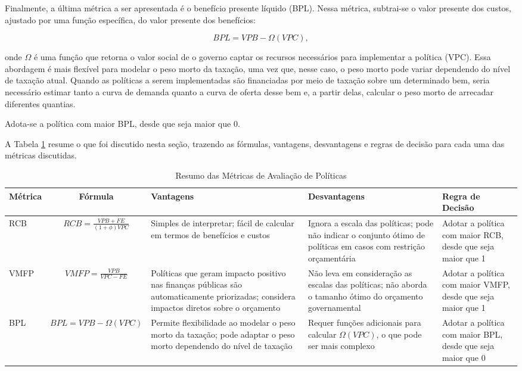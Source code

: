 \documentclass[12pt,letterpaper]{article}
\newcommand{\1}{\mathbbm{1}}
\numberwithin{equation}{section}
\begin{document}
Finalmente, a última métrica a ser apresentada é o benefício presente líquido (BPL). Nessa métrica, subtrai-se o valor presente dos custos, ajustado por uma função específica, do valor presente dos benefícios:

\begin{equation}
    BPL = VPB - \Omega(VPC),
\end{equation}

onde $\Omega$ é uma função que retorna o valor social de o governo captar os recursos necessários para implementar a política (VPC). Essa abordagem é mais flexível para modelar o peso morto da taxação, uma vez que, nesse caso, o peso morto pode variar dependendo do nível de taxação atual. Quando as políticas a serem implementadas são financiadas por meio de taxação sobre um determinado bem, seria necessário estimar tanto a curva de demanda quanto a curva de oferta desse bem e, a partir delas, calcular o peso morto de arrecadar diferentes quantias.

Adota-se a política com maior BPL, desde que seja maior que 0.

A Tabela \ref{tab:resumo_metricas} resume o que foi discutido nesta seção, trazendo as fórmulas, vantagens, desvantagens e regras de decisão para cada uma das métricas discutidas.

\begin{table}[H]
\centering
\caption{Resumo das Métricas de Avaliação de Políticas}
\begin{adjustbox}{max width=0.95\textwidth,max totalheight=0.95\textheight,keepaspectratio,center}
\begin{tabular}{|l|c|p{4cm}|p{4cm}|p{4cm}|}
\hline
\textbf{Métrica} & \textbf{Fórmula} & \textbf{Vantagens} & \textbf{Desvantagens} & \textbf{Regra de Decisão} \\
\hline
RCB & 
$RCB = \frac{VPB + FE}{(1 + \phi) VPC}$ & 
Simples de interpretar; fácil de calcular em termos de benefícios e custos & 
Ignora a escala das políticas; pode não indicar o conjunto ótimo de políticas em casos com restrição orçamentária & 
Adotar a política com maior RCB, desde que seja maior que 1 \\
\hline
VMFP & 
$VMFP = \frac{VPB}{VPC - FE}$ & 
Políticas que geram impacto positivo nas finanças públicas são automaticamente priorizadas; considera impactos diretos sobre o orçamento & 
Não leva em consideração as escalas das políticas; não aborda o tamanho ótimo do orçamento governamental & 
Adotar a política com maior VMFP, desde que seja maior que 1 \\
\hline
BPL & 
$BPL = VPB - \Omega(VPC)$ & 
Permite flexibilidade ao modelar o peso morto da taxação; pode adaptar o peso morto dependendo do nível de taxação & 
Requer funções adicionais para calcular $\Omega(VPC)$, o que pode ser mais complexo & 
Adotar a política com maior BPL, desde que seja maior que 0 \\
\hline
\end{tabular}
\end{adjustbox}
\label{tab:resumo_metricas}
\end{table}
\end{document}
